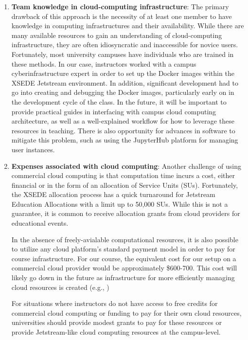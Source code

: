 \begin{enumerate}

\item {\bf Team knowledge in cloud-computing infrastructure}: The primary drawback of
this approach is the necessity of at least one member to have knowledge
in computing infrastructures and
their availability. While there are many available resources to gain an
understanding of cloud-computing infrastructure, they are often idiosyncratic and
inaccessible for novice users. Fortunately, most university campuses
have individuals who are trained in these methods. In our case, instructors
worked with a campus cyberinfrastructure expert in order to set up the Docker images within
the XSEDE Jetstream environment. In addition, significant development had to go
into creating and debugging the Docker images, particularly early on in the
development cycle of the class. In the future, it will be important to provide
practical guides in interfacing with campus cloud computing architecture, as
well as a well-explained workflow for how to leverage these resources in
teaching. There is also opportunity for advances in software to mitigate this
problem, such as using the JupyterHub \cite{perez2015project} platform
for managing user instances.

\item {\bf Expenses associated with cloud computing}: Another challenge of using
commercial cloud computing is that computation time incurs a cost, either
financial or in the form of an allocation of Service Units (SUs).
Fortunately, the XSEDE allocation process has a quick
turnaround for Jetstream Education Allocations with a limit up to 50,000 SUs.
While this is not a guarantee, it is common to receive allocation grants
from cloud providers for educational events.

In the absence of freely-avialable computational resources, it is also
possible to utilize any cloud platform's standard payment model in order
to pay for course infrastructure. For our course, the equivalent cost
for our setup on a commercial cloud provider would be approximately \$600-700.
This cost will likely go down in the future as infrastructure for more efficiently
managing cloud resources is created (e.g., \cite{perez2015project})

For situations where instructors do not have access to free credits for
commercial cloud computing or funding to pay for their own
cloud resources, universities should provide modest grants to pay for
these resources or provide Jetstream-like cloud computing resources at the
campus-level.


\end{enumerate}
